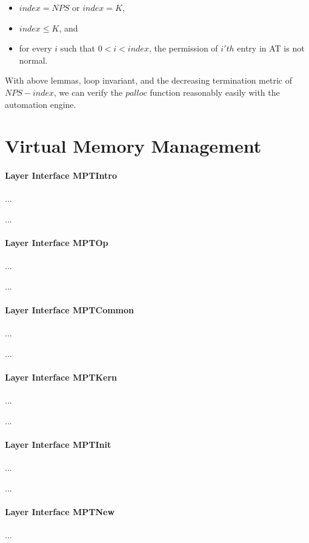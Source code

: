 \begin{definition} 
\begin{itemize}
\item $index=NPS$ or $index=K$,
\item $index\le K$, and
\item for every $i$ such that $0<i<index$, the permission of $i'th$ entry in AT is not normal.
\end{itemize}
\end{definition}

With above lemmas, loop invariant, and the decreasing termination metric of $NPS-index$, we can verify
the $palloc$ function reasonably easily with the automation engine.


\section{Virtual Memory Management}

\paragraph{Layer Interface MPTIntro}
...

...

\paragraph{Layer Interface MPTOp}
...

...

\paragraph{Layer Interface MPTCommon}
...

...

\paragraph{Layer Interface MPTKern}
...

...

\paragraph{Layer Interface MPTInit}
...

...

\paragraph{Layer Interface MPTNew}
...

